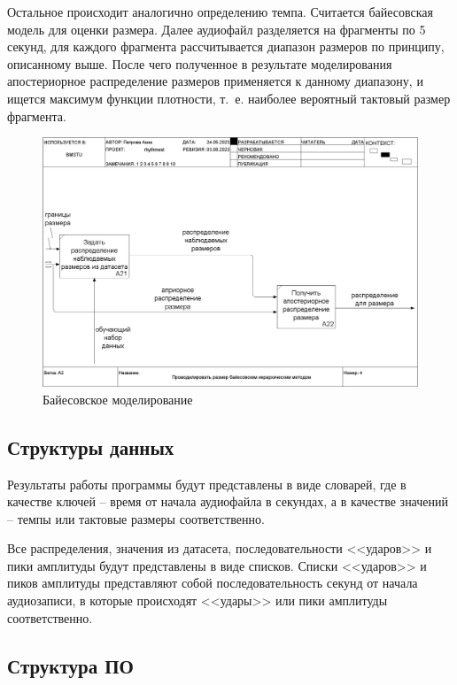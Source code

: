 Остальное происходит аналогично определению темпа. Считается байесовская модель для оценки размера. Далее аудиофайл разделяется на фрагменты по 5 секунд, для каждого фрагмента рассчитывается диапазон размеров по принципу, описанному выше. После чего полученное в результате моделирования апостериорное распределение размеров применяется к данному диапазону, и ищется максимум функции плотности, т.~е. наиболее вероятный тактовый размер фрагмента.

\begin{figure}[h]
	\centering
	\includegraphics[scale=0.25]{inc/img/rhythm_idef/04_A2.png}
	\caption{Байесовское моделирование}
	\label{img:rhythm_3}
\end{figure}

\clearpage

\subsection{Структуры данных}

Результаты работы программы будут представлены в виде словарей, где в качестве ключей -- время от начала аудиофайла в секундах, а в качестве значений -- темпы или тактовые размеры соответственно.

Все распределения, значения из датасета, последовательности <<ударов>> и пики амплитуды будут представлены в виде списков. Списки <<ударов>> и пиков амплитуды представляют собой последовательность секунд от начала аудиозаписи, в которые происходят <<удары>> или пики амплитуды соответственно.

\subsection{Структура ПО}

